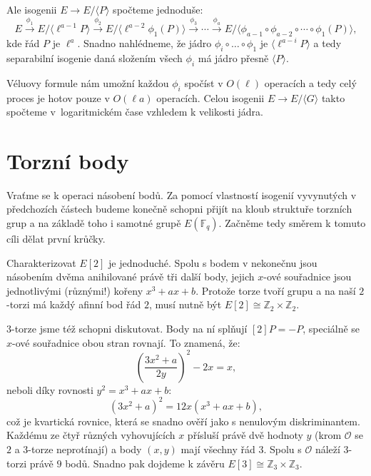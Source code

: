 \documentclass[12pt]{report}
\begin{document}
Ale isogenii $E \longrightarrow E/\langle P \rangle$ spočteme jednoduše:
\begin{equation*}
E \stackrel{\phi_1}{\longrightarrow} E/\langle \ell^{a-1} P \rangle \stackrel{\phi_2}{\longrightarrow}  E/\langle \ell^{a-2} \phi_1 (P) \rangle \stackrel{\phi_3}{\longrightarrow} \cdots \stackrel{\phi_{a}}{\longrightarrow} E/\langle \phi_{a-1} \circ \phi_{a-2} \circ \cdots \circ \phi_1 (P) \rangle,
\end{equation*}
kde řád $P$ je $\ell^a$. Snadno nahlédneme, že jádro $\phi_i \circ \dots \circ \phi_1$ je $\langle \ell^{a-i} P \rangle$ a tedy separabilní isogenie daná složením všech $\phi_i$ má jádro přesně $\langle P \rangle$.

Véluovy formule nám umožní každou $\phi_i$ spočíst v $O(\ell)$ operacích a tedy celý proces je hotov pouze v $O(\ell a)$ operacích. Celou isogenii $E \longrightarrow E/\langle G \rangle$ takto spočteme v~logaritmickém čase vzhledem k velikosti jádra.

\section{Torzní body}

Vraťme se k operaci násobení bodů. Za pomocí vlastností isogenií vyvynutých v předchozích částech budeme konečně schopni přijít na kloub struktuře torzních grup a na základě toho i samotné grupě $E(\mathbb{F}_q)$. Začněme tedy směrem k tomuto cíli dělat první krůčky.

Charakterizovat $E[2]$ je jednoduché. Spolu s bodem v nekonečnu jsou násobením dvěma anihilované právě tři další body, jejich $x$-ové souřadnice jsou jednotlivými (různými!) kořeny $x^3+ax+b$. Protože torze tvoří grupu a na naší $2$-torzi má každý afinní bod řád $2$, musí nutně být $E[2] \cong \mathbb{Z}_2 \times \mathbb{Z}_2$.

$3$-torze jsme též schopni diskutovat. Body na ní splňují $[2]P = -P$, speciálně se $x$-ové souřadnice obou stran rovnají. To znamená, že:
\begin{equation*}
\left(\frac{3x^2+a}{2y}\right)^2 -2x = x,
\end{equation*}
neboli díky rovnosti $y^2 = x^3+ax+b$:
\begin{equation*}
(3x^2+a)^2 = 12x(x^3+ax+b),
\end{equation*}
což je kvartická rovnice, která se snadno ověří jako s nenulovým diskriminantem. Každému ze čtyř různých vyhovujících $x$ přísluší právě dvě hodnoty $y$ (krom $\mathcal{O}$ se $2$ a $3$-torze neprotínají) a body $(x,y)$ mají všechny řád $3$. Spolu s $\mathcal{O}$ náleží $3$-torzi právě $9$ bodů. Snadno pak dojdeme k závěru $E[3] \cong \mathbb{Z}_3 \times \mathbb{Z}_3$.
\end{document}
